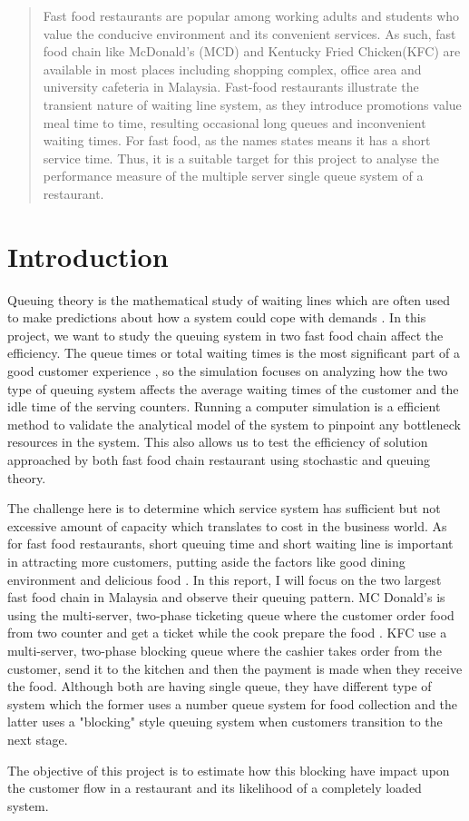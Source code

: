 
\begin{abstract}

	Fast food restaurants are popular among working adults and students who value the conducive environment and its convenient services. As such, fast food chain like McDonald's (MCD) and Kentucky Fried Chicken(KFC) are available in most places including shopping complex, office area and university cafeteria in Malaysia. Fast-food restaurants illustrate the transient nature of waiting line system, as they introduce promotions value meal time to time, resulting occasional long queues and inconvenient waiting times. For fast food, as the names states means it has a short service time. Thus, it is a suitable target for this project to analyse the performance measure of the multiple server single queue system of a restaurant.

\end{abstract}

\section{Introduction}
Queuing theory is the mathematical study of waiting lines which are often used to make predictions about how a system could cope with demands \cite{adan2002queueing}. In this project, we want to study the queuing system in two fast food chain affect the efficiency.
The queue times or total waiting times is the most significant part of a good customer experience \cite{ROY201629}, so the simulation focuses on analyzing how the two type of queuing system affects the average waiting times of the customer and the idle time of the serving counters.
Running a computer simulation is a efficient method to validate the analytical model of the system to pinpoint any bottleneck resources in the system. This also allows us to test the efficiency of solution approached by both fast food chain restaurant using stochastic and queuing theory.

The challenge here is to determine which service system has sufficient but not excessive amount of capacity which translates to cost in the business world. As for fast food restaurants, short queuing time and short waiting line is important in attracting more customers, putting aside the factors like good dining environment and delicious food \cite{dharmawirya2012analysis}. In this report, I will focus on the two largest fast food chain in Malaysia \cite{abdullah2015trend} and observe their queuing pattern. MC Donald's is using the multi-server, two-phase ticketing queue where the customer order food from two counter and get a ticket while the cook prepare the food \cite{Kohimprovemcd}. KFC use a multi-server, two-phase blocking queue where the cashier takes order from the customer, send it to the kitchen and then the payment is made when they receive the food. Although both are having single queue, they have different type of system which the former uses a number queue system for food collection and the latter uses a "blocking" style queuing system when customers transition to the next stage.

The objective of this project is to estimate how this blocking have impact upon the customer flow in a restaurant and its likelihood of a completely loaded system.
